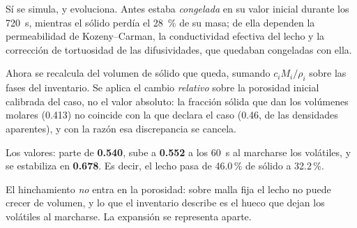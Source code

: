 Sí se simula, y evoluciona. Antes estaba \emph{congelada} en su valor inicial durante los \SI{720}{\second}, mientras el sólido perdía el \qty{28}{\percent} de su masa; de ella dependen la permeabilidad de Kozeny--Carman, la conductividad efectiva del lecho y la corrección de tortuosidad de las difusividades, que quedaban congeladas con ella.

Ahora se recalcula del volumen de sólido que queda, sumando $c_i M_i/\rho_i$ sobre las fases del inventario. Se aplica el cambio \emph{relativo} sobre la porosidad inicial calibrada del caso, no el valor absoluto: la fracción sólida que dan los volúmenes molares (\num{0.413}) no coincide con la que declara el caso (\num{0.46}, de las densidades aparentes), y con la razón esa discrepancia se cancela.

Los valores: parte de \textbf{0.540}, sube a \textbf{0.552} a los \SI{60}{\second} al marcharse los volátiles, y se estabiliza en \textbf{0.678}. Es decir, el lecho pasa de 46.0\,\% de sólido a 32.2\,\%.

El hinchamiento \emph{no} entra en la porosidad: sobre malla fija el lecho no puede crecer de volumen, y lo que el inventario describe es el hueco que dejan los volátiles al marcharse. La expansión se representa aparte.
